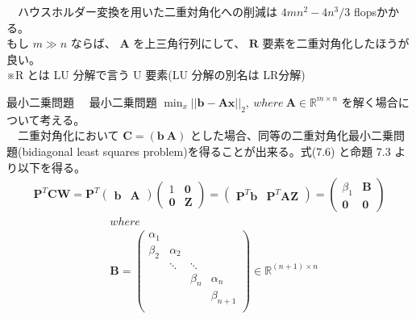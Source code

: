 \documentclass[dvipdfmx,10pt,presentation]{beamer}
\begin{document}
\begin{frame}[label={sec:org9eb9b20}]{}
　ハウスホルダー変換を用いた二重対角化への削減は \(4mn^2 - 4n^3 / 3\) flopsかかる。\\
もし \(m \gg n\) ならば、 \(\bm{A}\) を上三角行列にして、 \(\bm{R}\) 要素を二重対角化したほうが良い。\\
※R とは LU 分解で言う U 要素(LU 分解の別名は LR分解)\\
\end{frame}
\begin{frame}[allowframebreaks]{最小二乗問題}
　最小二乗問題 \(\min_x||\bm{b}-\bm{A}\bm{x}||_2,\ where\ \bm{A}\in\mathbb{R}^{m\times n}\) を解く場合について考える。\\
　二重対角化において \(\bm{C} = (\bm{b}\  \bm{A})\) とした場合、同等の二重対角化最小二乗問題(bidiagonal least squares problem)を得ることが出来る。式(7.6) と命題 7.3 より以下を得る。\\
\begin{align*}
\bm{P}^T\bm{C}\bm{W} = \bm{P}^T
\begin{pmatrix}
\bm{b} & \bm{A}
\end{pmatrix}
\begin{pmatrix}
1 & \bm{0}\\
\bm{0} & \bm{Z}
\end{pmatrix}
=
\begin{pmatrix}
\bm{P}^T\bm{b}& \bm{P}^T\bm{A}\bm{Z}
\end{pmatrix}
=
\begin{pmatrix}
\beta_1 & \bm{B}\\
\bm{0} & \bm{0}
\end{pmatrix} \tag{7.7}
\end{align*}
\begin{align*}
&where \\
&\bm{B} =
\begin{pmatrix}
 \alpha_1& & & \\
\beta_2& \alpha_2&  & \\
&\ddots& \ddots &   \\
&& \beta_n& \alpha_n   \\
&&& \beta_{n+1}   \\
\end{pmatrix}
\in \mathbb{R}^{(n+1)\times n}
\end{align*}
\end{frame}
\end{document}
